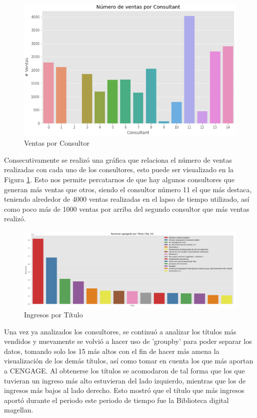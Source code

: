 \documentclass{article}
\begin{document}
        \begin{figure}[h!]
            \centering
            \includegraphics[width = \columnwidth]{img/num_sales_consultant.PNG}
            \caption{Ventas por Consultor}
            \label{fig:ventConsultor}
        \end{figure}

        Consecutivamente se realizó una gráfica que relaciona el número de ventas realizadas con cada uno de los consultores, esto puede ser visualizado en la Figura \ref{fig:ventConsultor}. Esto nos permite percatarnos de que hay algunos consultores que generan más ventas que otros, siendo el consultor número 11 el que más destaca, teniendo alrededor de 4000 ventas realizadas en el lapso de tiempo utilizado, así como poco más de 1000 ventas por arriba del segundo consultor que más ventas realizó.


        \begin{figure}[h!]
            \centering
            \includegraphics[width = \columnwidth]{img/revenue_title.png}
            \caption{Ingresos por Título}
            \label{fig:revTítulo}
        \end{figure}

        Una vez ya analizados los consultores, se continuó a analizar los títulos más vendidos y nuevamente se volvió a hacer uso de 'groupby' para poder separar los datos, tomando solo los 15 más altos con el fin de hacer más amena la visualización de los demás títulos, así como tomar en cuenta los que más aportan a CENGAGE. Al obtenerse los títulos se acomodaron de tal forma que los que tuvieran un ingreso más alto estuvieran del lado izquierdo, mientras que los de ingresos más bajos al lado derecho. Esto mostró que el título que más ingresos aportó durante el periodo este periodo de tiempo fue la Biblioteca digital magellan.
\end{document}

